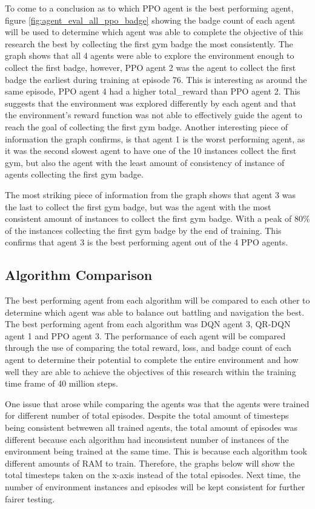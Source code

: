 To come to a conclusion as to which PPO agent is the best performing agent, figure \ref{fig:agent_eval_all_ppo_badge} showing the badge count of each agent will be used to determine which agent was able to complete the objective of this research the best by collecting the first gym badge the most consistently. The graph shows that all 4 agents were able to explore the environment enough to collect the first badge, however, PPO agent 2 was the agent to collect the first badge the earliest during training at episode 76. This is interesting as around the same episode, PPO agent 4 had a higher total\_reward than PPO agent 2. This suggests that the environment was explored differently by each agent and that the environment's reward function was not able to effectively guide the agent to reach the goal of collecting the first gym badge. Another interesting piece of information the graph confirms, is that agent 1 is the worst performing agent, as it was the second slowest agent to have one of the 10 instances collect the first gym, but also the agent with the least amount of consistency of instance of agents collecting the first gym badge. 

The most striking piece of information from the graph shows that agent 3 was the last to collect the first gym badge, but was the agent with the most consistent amount of instances to collect the first gym badge. With a peak of 80\% of the instances collecting the first gym badge by the end of training. This confirms that agent 3 is the best performing agent out of the 4 PPO agents.

\subsection{Algorithm Comparison}

The best performing agent from each algorithm will be compared to each other to determine which agent was able to balance out battling and navigation the best. The best performing agent from each algorithm was DQN agent 3, QR-DQN agent 1 and PPO agent 3. The performance of each agent will be compared through the use of comparing the total reward, loss, and badge count of each agent to determine their potential to complete the entire environment and how well they are able to achieve the objectives of this research within the training time frame of 40 million steps. 

One issue that arose while comparing the agents was that the agents were trained for different number of total episodes. Despite the total amount of timesteps being consistent betwewen all trained agents, the total amount of episodes was different because each algorithm had inconsistent number of instances of the environment being trained at the same time. This is because each algorithm took different amounts of RAM to train. Therefore, the graphs below will show the total timesteps taken on the x-axis instead of the total episodes. Next time, the number of environment instances and episodes will be kept consistent for further fairer testing. 

